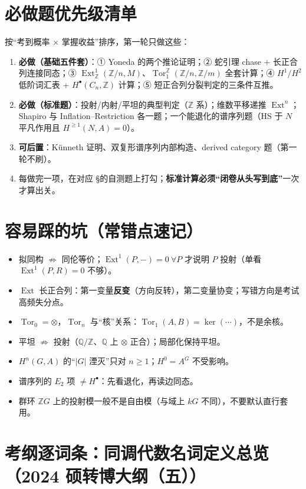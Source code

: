 \documentclass[12pt,a4paper]{ctexart}
\DeclareMathOperator{\Ext}{Ext}
\DeclareMathOperator{\Tor}{Tor}
\begin{document}
\section{必做题优先级清单}

按“考到概率 $\times$ 掌握收益”排序，第一轮只做这些：
\begin{enumerate}
  \item \textbf{必做（基础五件套）}：① Yoneda 的两个推论证明；② 蛇引理 chase + 长正合列连接同态；③ $\Ext^1_\mathbb Z(\mathbb Z/n,M)$、$\Tor_1^\mathbb Z(\mathbb Z/n,\mathbb Z/m)$ 全套计算；④ $H^1/H^2$ 低阶词汇表 + $H^\bullet(C_n,\mathbb Z)$ 计算；⑤ 短正合列分裂判定的三条件互推。
  \item \textbf{必做（标准题）}：投射/内射/平坦的典型判定（$\mathbb Z$ 系）；维数平移递推 $\Ext^n$；Shapiro 与 Inflation--Restriction 各一题；一个能退化的谱序列题（HS 于 $N$ 平凡作用且 $H^{\ge1}(N,A)=0$）。
  \item \textbf{可后置}：K\"unneth 证明、双复形谱序列内部构造、derived category 题（第一轮不刷）。
  \item 每做完一项，在对应 \S 的自测题上打勾；\textbf{标准计算必须“闭卷从头写到底”}一次才算出关。
\end{enumerate}

\section*{容易踩的坑（常错点速记）}

\begin{itemize}
  \item 拟同构 $\not\Rightarrow$ 同伦等价；$\Ext^1(P,-)=0\ \forall P$ 才说明 $P$ 投射（单看 $\Ext^1(P,R)=0$ 不够）。
  \item $\Ext$ 长正合列：第一变量\textbf{反变}（方向反转），第二变量协变；写错方向是考试高频失分点。
  \item $\Tor_0=\otimes$，$\Tor_n$ 与“核”关系：$\Tor_1(A,B)=\ker(\cdots)$，不是余核。
  \item 平坦 $\not\Rightarrow$ 投射（$\mathbb Q/\mathbb Z$、$\mathbb Q$ 上 $\otimes$ 正合）；局部化保持平坦。
  \item $H^n(G,A)$ 的“$|G|$ 湮灭”只对 $n\ge1$；$H^0=A^G$ 不受影响。
  \item 谱序列的 $E_2$ 项 $\neq H^\bullet$：先看退化，再读边同态。
  \item 群环 $\mathbb ZG$ 上的投射模一般不是自由模（与域上 $kG$ 不同），不要默认直行套用。
\end{itemize}

\section{考纲逐词条：同调代数名词定义总览（2024 硕转博大纲（五））}
\end{document}
